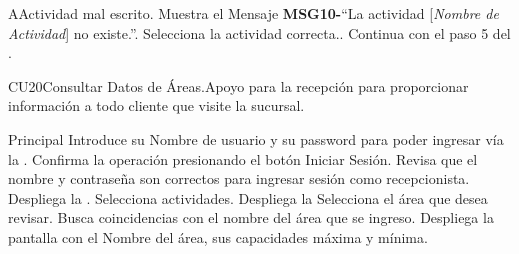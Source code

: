 		\begin{UCtrayectoriaA}{A}{Actividad mal escrito.}
			\UCpaso[\UCactor] Muestra el Mensaje {\bf MSG10-}``La actividad [{\em Nombre de Actividad}] no existe.''.
			\UCpaso[\UCactor] Selecciona la actividad correcta..
			\UCpaso[] Continua con el paso 5 del .
		\end{UCtrayectoriaA}
			


\begin{UseCase}{CU20}{Consultar Datos de Áreas.}{Apoyo para la recepción para proporcionar información a todo cliente que visite la sucursal.}
	\end{UseCase}
	\begin{UCtrayectoria}{Principal}
		\UCpaso[\UCactor] Introduce su Nombre de usuario y su password para poder ingresar vía la  \label{CU1LoginJI}.
		\UCpaso[\UCactor] Confirma la operación presionando el botón Iniciar Sesión.
		\UCpaso Revisa que el nombre y contraseña son correctos para ingresar sesión como recepcionista.
		\UCpaso Despliega la .
		\UCpaso[\UCactor]Selecciona actividades.
		\UCpaso Despliega la 
		\UCpaso[\UCactor]Selecciona el área que desea revisar.
		\UCpaso Busca coincidencias con el nombre del área que se ingreso.
		\UCpaso Despliega la pantalla con el Nombre del área, sus capacidades máxima y mínima.
	\end{UCtrayectoria}
		
